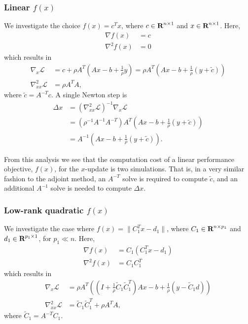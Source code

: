 \documentclass{article}
\newcommand{\inv}[1]{\frac{1}{#1}}
\newcommand{\tC}{\tilde{C}}
\begin{document}
\subsubsection{Linear $f(x)$}
We investigate the choice $f(x) = c^T x$, 
    where $c \in {\mbox{\bf R}}^{n \times 1}$
    and $x \in {\mbox{\bf R}}^{n \times 1}$.
Here,
    \begin{subequations}\begin{align}
    \nabla f(x) &= c \\
    \nabla^2 f(x) &= 0
    \end{align}\end{subequations}
    which results in
    \begin{subequations}\begin{align}
    \nabla_x \mathcal{L} &= c + \rho A^T (A x - b + \inv{\rho} y) 
        = \rho A^T (Ax - b + \inv{\rho}(y + \tilde{c})) \\
    \nabla_{xx}^2 \mathcal{L} &= \rho A^T A,
    \end{align}\end{subequations}
    where $\tilde{c} = A^{-T} c$.
A single Newton step is
    \begin{equation}\begin{split}
    \Delta x &= (\nabla_{xx}^2 \mathcal{L})^{-1} \nabla_x \mathcal{L} \\
        &= (\rho^{-1} A^{-1} A^{-T}) 
            A^T (A x - b + \inv{\rho}(y + \tilde c)) \\
        &= A^{-1}(A x - b + \inv{\rho}(y + \tilde c)).
    \end{split}\end{equation}

From this analysis we see that 
    the computation cost of a linear performance objective, $f(x)$, 
    for the $x$-update is two simulations.
That is, in a very similar fashion to the adjoint method,
    an $A^{-T}$ solve is required to compute $\tilde{c}$,
    and an additional $A^{-1}$ solve is needed to compute $\Delta x$.

\subsubsection{Low-rank quadratic $f(x)$}
We investigate the case where $f(x) = \|C_1^T x - d_1\|$,
    where $C_1 \in {\mbox{\bf R}}^{n \times p_1}$
    and $d_1 \in {\mbox{\bf R}}^{p_1 \times 1}$, for $p_1 \ll n$.
Here,
    \begin{subequations}\begin{align}
    \nabla f(x) &= C_1 (C_1^T x - d_1) \\
    \nabla^2 f(x) &= C_1 C_1^T
    \end{align}\end{subequations}
    which results in
    \begin{subequations}\begin{align}
    \nabla_x \mathcal{L} &= \rho A^T ((I + \inv{\rho}\tC_1\tC_1^T)Ax
        - b + \inv{\rho}(y - \tC_1 d)) \\
    \nabla_{xx}^2 \mathcal{L} &= \tC_1\tC_1^T + \rho A^T A,
    \end{align}\end{subequations}
    where $\tC_1 = A^{-T}C_1$.
\end{document}
